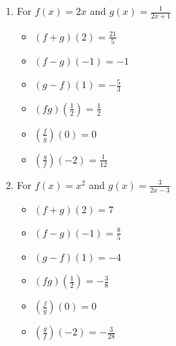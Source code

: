 \begin{enumerate}
\newpage

\item For  $f(x) = 2x$ and  $g(x) = \frac{1}{2x+1}$

\begin{multicols}{3}
\begin{itemize}

\item  $(f+g)(2) = \frac{21}{5}$
\item  $(f-g)(-1) = -1$
\item  $(g-f)(1) = -\frac{5}{3}$

\end{itemize}
\end{multicols}

\begin{multicols}{3}
\begin{itemize}

\item  $(fg)\left(\frac{1}{2}\right) = \frac{1}{2}$
\item  $\left(\frac{f}{g}\right)(0) = 0$
\item  $\left(\frac{g}{f}\right)\left(-2\right) = \frac{1}{12}$

\end{itemize}
\end{multicols}

\item For  $f(x) = x^2$ and $g(x) = \frac{3}{2x-3}$

\begin{multicols}{3}
\begin{itemize}

\item  $(f+g)(2) = 7$
\item  $(f-g)(-1) = \frac{8}{5}$
\item  $(g-f)(1) = -4$

\end{itemize}
\end{multicols}

\begin{multicols}{3}
\begin{itemize}

\item  $(fg)\left(\frac{1}{2}\right) = -\frac{3}{8}$
\item  $\left(\frac{f}{g}\right)(0) = 0$
\item  $\left(\frac{g}{f}\right)\left(-2\right) = -\frac{3}{28}$

\end{itemize}
\end{multicols}


\end{enumerate}
